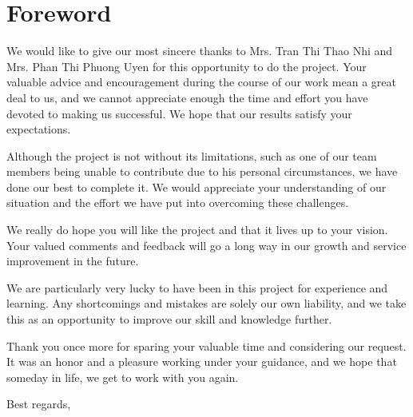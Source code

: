 \section{Foreword}
\label{sec:foreword}

\hspace{1cm} We would like to give our most sincere thanks to Mrs. Tran Thi Thao Nhi and Mrs. Phan Thi Phuong Uyen for this opportunity to do the project. Your valuable advice and encouragement during the course of our work mean a great deal to us, and we cannot appreciate enough the time and effort you have devoted to making us successful. We hope that our results satisfy your expectations.

\vspace{0.5cm}

\hspace{1cm} Although the project is not without its limitations, such as one of our team members being unable to contribute due to his personal circumstances, we have done our best to complete it. We would appreciate your understanding of our situation and the effort we have put into overcoming these challenges.

\vspace{0.5cm}

\hspace{1cm} We really do hope you will like the project and that it lives up to your vision. Your valued comments and feedback will go a long way in our growth and service improvement in the future.

\vspace{0.5cm}

\hspace{1cm} We are particularly very lucky to have been in this project for experience and learning. Any shortcomings and mistakes are solely our own liability, and we take this as an opportunity to improve our skill and knowledge further.

\vspace{0.5cm}

\hspace{1cm} Thank you once more for sparing your valuable time and considering our request. It was an honor and a pleasure working under your guidance, and we hope that someday in life, we get to work with you again.

\vspace{0.5cm}

\hspace{1cm} Best regards,

